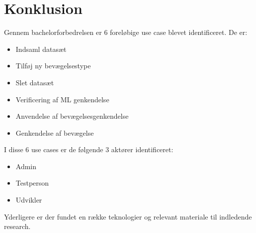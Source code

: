 \thispagestyle{fancy}
\chapter{Konklusion}
\label{chp:konklusion}
Gennem bachelorforbedrelsen er 6 foreløbige use case blevet identificeret. De er:
\begin{itemize}
	\item Indsaml datasæt
	\item Tilføj ny bevægelsestype
	\item Slet datasæt
	\item Verificering af ML genkendelse
	\item Anvendelse af bevægelsesgenkendelse
	\item Genkendelse af bevægelse
\end{itemize}
I disse 6 use cases er de følgende 3 aktører identificeret:
\begin{itemize}
	\item Admin
	\item Testperson
	\item Udvikler
\end{itemize}
Yderligere er der fundet en række teknologier og relevant materiale til indledende research.